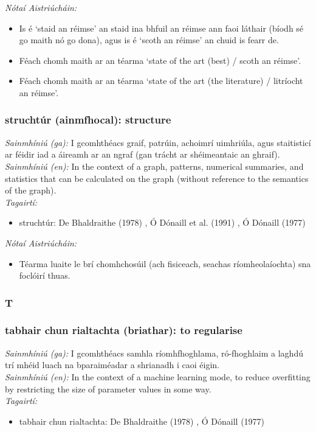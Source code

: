  \noindent \textit{Nótaí Aistriúcháin:}
\begin{itemize}
	\item Is é `staid an réimse' an staid ina bhfuil an réimse ann faoi láthair (bíodh sé go maith nó go dona), agus is é `scoth an réimse' an chuid is fearr de.
	\item Féach chomh maith ar an téarma `state of the art (best) / scoth an réimse'.
	\item Féach chomh maith ar an téarma `state of the art (the literature) / litríocht an réimse'.
\end{itemize}


\subsubsection*{struchtúr (ainmfhocal): structure}
 \noindent \textit{Sainmhíniú (ga):} I gcomhthéacs graif, patrúin, achoimrí uimhriúla, agus staitisticí ar féidir iad a áireamh ar an ngraf (gan trácht ar shéimeantaic an ghraif).
\\
 \noindent \textit{Sainmhíniú (en):} In the context of a graph, patterns, numerical summaries, and statistics that can be calculated on the graph (without reference to the semantics of the graph).
\\
 \noindent \textit{Tagairtí:}
\begin{itemize}
	\item struchtúr: De Bhaldraithe (1978) \cite{de-bhaldraithe}, Ó Dónaill et al. (1991) \cite{focloir-beag}, Ó Dónaill (1977) \cite{odonaill}
\end{itemize}

 \noindent \textit{Nótaí Aistriúcháin:}
\begin{itemize}
	\item Téarma luaite le brí chomhchosúil (ach fisiceach, seachas ríomheolaíochta) sna foclóirí thuas.
\end{itemize}


 \subsubsection*{T}

\subsubsection*{tabhair chun rialtachta (briathar): to regularise}
 \noindent \textit{Sainmhíniú (ga):} I gcomhthéacs samhla ríomhfhoghlama, ró-fhoghlaim a laghdú trí mhéid luach na bparaiméadar a shrianadh i caoi éigin.
\\
 \noindent \textit{Sainmhíniú (en):} In the context of a machine learning mode, to reduce overfitting by restricting the size of parameter values in some way.
\\
 \noindent \textit{Tagairtí:}
\begin{itemize}
	\item tabhair chun rialtachta: De Bhaldraithe (1978) \cite{de-bhaldraithe}, Ó Dónaill (1977) \cite{odonaill}
\end{itemize}

